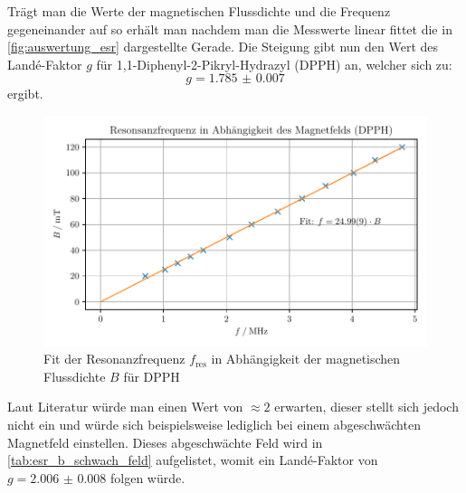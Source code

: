 \documentclass[ngerman]{scrartcl}
\begin{document}
Trägt man die Werte der magnetischen Flussdichte und die Frequenz gegeneinander auf so erhält man nachdem man die Messwerte linear fittet die in \autoref{fig:auswertung_esr} dargestellte Gerade. Die Steigung gibt nun den Wert des Landé-Faktor $g$ für 1,1-Diphenyl-2-Pikryl-Hydrazyl (DPPH) an, welcher sich zu:
\[g = \num{1.785(7)}\]
ergibt.
\begin{figure}[H]
    \centering
    \begin{samepage}
        \includegraphics[width=0.8\linewidth]{../python/plots/esr.pdf}
        \caption[ESR - Fit]{Fit der Resonanzfrequenz $f_{\text{res}}$ in Abhängigkeit der magnetischen Flussdichte $B$ für DPPH}
        \label{fig:auswertung_esr}
    \end{samepage}
\end{figure}
Laut Literatur würde man einen Wert von $\approx 2$ erwarten, dieser stellt sich jedoch nicht ein und würde sich beispielsweise lediglich bei einem abgeschwächten Magnetfeld einstellen. Dieses abgeschwächte Feld wird in \autoref{tab:esr_b_schwach_feld} aufgelistet, womit ein Landé-Faktor von $g = \num{2.006(8)}$ folgen würde.
\end{document}
